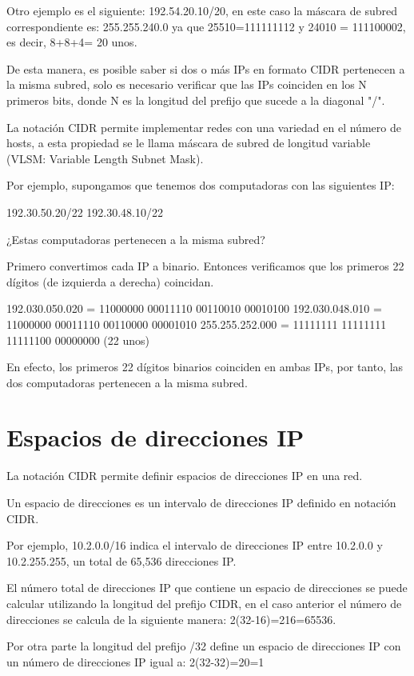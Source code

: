 Otro ejemplo es el siguiente: 192.54.20.10/20, en este caso la máscara de subred correspondiente es: 255.255.240.0 ya que 25510=111111112 y 24010 = 111100002, es decir, 8+8+4= 20 unos.

De esta manera, es posible saber si dos o más IPs en formato CIDR pertenecen a la misma subred, solo es necesario verificar que las IPs coinciden en los N primeros bits, donde N es la longitud del prefijo que sucede a la diagonal "/".

La notación CIDR permite implementar redes con una variedad en el número de hosts, a esta propiedad se le llama máscara de subred de longitud variable (VLSM: Variable Length Subnet Mask).

Por ejemplo, supongamos que tenemos dos computadoras con las siguientes IP:

192.30.50.20/22 192.30.48.10/22

¿Estas computadoras pertenecen a la misma subred?

Primero convertimos cada IP a binario. Entonces verificamos que los primeros 22 dígitos (de izquierda a derecha) coincidan.

192.030.050.020 = 11000000 00011110 00110010 00010100 192.030.048.010 = 11000000 00011110 00110000 00001010 255.255.252.000 = 11111111 11111111 11111100 00000000  (22 unos)

En efecto, los primeros 22 dígitos binarios coinciden en ambas IPs, por tanto, las dos computadoras pertenecen a la misma subred.

\section{Espacios de direcciones IP}

La notación CIDR permite definir espacios de direcciones IP en una red.

Un espacio de direcciones es un intervalo de direcciones IP definido en notación CIDR.

Por ejemplo, 10.2.0.0/16 indica el intervalo de direcciones IP entre 10.2.0.0 y 10.2.255.255, un total de 65,536 direcciones IP.

El número total de direcciones IP que contiene un espacio de direcciones se puede calcular utilizando la longitud del prefijo CIDR, en el caso anterior el número de direcciones se calcula de la siguiente manera: 2(32-16)=216=65536.

Por otra parte la longitud del prefijo /32 define un espacio de direcciones IP con un número de direcciones IP igual a: 2(32-32)=20=1

